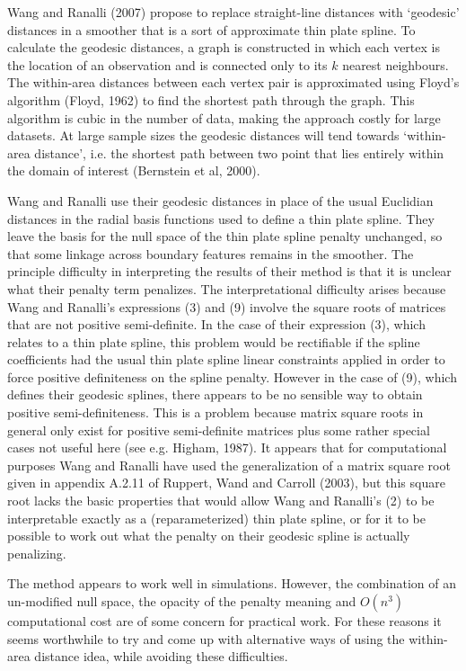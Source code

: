 \documentclass[useAMS, referee]{biom}
\begin{document}
Wang and Ranalli (2007) propose to replace straight-line distances with `geodesic' distances in a smoother that is a sort of approximate thin plate spline. To calculate the geodesic distances, a graph is constructed in which each vertex is the location of an observation and is connected only to its $k$ nearest neighbours. The within-area distances between each vertex pair is approximated using  Floyd's algorithm (Floyd, 1962) to find the shortest path through the graph. This algorithm is cubic in the number of data, making the approach costly for large datasets. At large sample sizes the geodesic distances will tend towards `within-area distance', i.e. the shortest path between two point that lies entirely within the domain of interest (Bernstein et al, 2000). 

Wang and Ranalli use their geodesic distances in place of the usual Euclidian distances in the radial basis functions used to define a thin plate spline. They leave the basis for the null space of the thin plate spline penalty unchanged, so that some linkage across boundary features remains in the smoother. The principle difficulty in interpreting the results of their method is that it is unclear what their penalty term penalizes. The interpretational difficulty arises because  Wang and Ranalli's expressions (3) and (9) involve the square roots of matrices that are not positive semi-definite. In the case of their expression (3), which relates to a thin plate spline, this problem would be rectifiable if the spline coefficients had the usual thin plate spline linear constraints applied in order to force positive definiteness on the spline penalty. However in the case of (9), which defines their geodesic splines, there appears to be no sensible way to obtain positive semi-definiteness. This is a problem because matrix square roots in general only exist for positive semi-definite matrices plus some rather special cases not useful here (see e.g. Higham, 1987). It appears that for computational purposes Wang and Ranalli have used the generalization of a matrix square root given in appendix A.2.11 of Ruppert, Wand and Carroll (2003), but this square root lacks the basic properties that would allow Wang and Ranalli's (2) to be interpretable exactly as a (reparameterized) thin plate spline, or for it to be possible to work out what the penalty on their geodesic spline is actually penalizing. 

The method appears to work well in simulations. However, the combination of an un-modified null space, the opacity of the penalty meaning and $O(n^3)$ computational cost are of some concern for practical work. For these reasons it seems worthwhile to try and come up with alternative ways of using the within-area distance idea, while avoiding these difficulties. 
\end{document}
